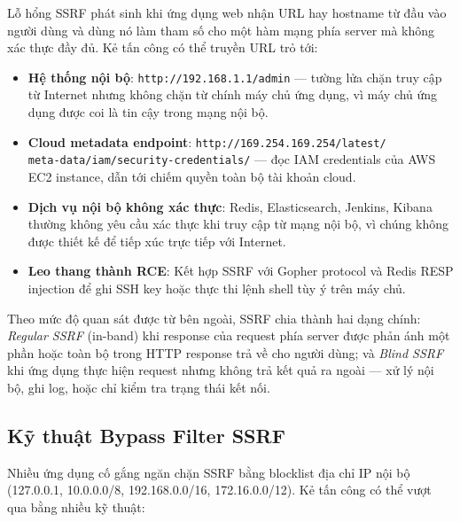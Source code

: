 Lỗ hổng SSRF phát sinh khi ứng dụng web nhận URL hay hostname từ đầu vào người dùng
và dùng nó làm tham số cho một hàm mạng phía server mà không xác thực đầy đủ. Kẻ
tấn công có thể truyền URL trỏ tới:

\begin{itemize}
    \item \textbf{Hệ thống nội bộ}: \texttt{http://192.168.1.1/admin} --- tường lửa
    chặn truy cập từ Internet nhưng không chặn từ chính máy chủ ứng dụng, vì máy chủ
    ứng dụng được coi là tin cậy trong mạng nội bộ.
    \item \textbf{Cloud metadata endpoint}: \texttt{http://169.254.169.254/latest/\\meta-data/iam/security-credentials/}
    --- đọc IAM credentials của AWS EC2 instance, dẫn tới chiếm quyền toàn bộ tài
    khoản cloud.
    \item \textbf{Dịch vụ nội bộ không xác thực}: Redis, Elasticsearch, Jenkins,
    Kibana thường không yêu cầu xác thực khi truy cập từ mạng nội bộ, vì chúng không
    được thiết kế để tiếp xúc trực tiếp với Internet.
    \item \textbf{Leo thang thành RCE}: Kết hợp SSRF với Gopher protocol và Redis RESP
    injection để ghi SSH key hoặc thực thi lệnh shell tùy ý trên máy chủ.
\end{itemize}

Theo mức độ quan sát được từ bên ngoài, SSRF chia thành hai dạng chính:
\textit{Regular SSRF} (in-band) khi response của request phía server được phản ánh
một phần hoặc toàn bộ trong HTTP response trả về cho người dùng; và \textit{Blind
SSRF} khi ứng dụng thực hiện request nhưng không trả kết quả ra ngoài --- xử lý nội
bộ, ghi log, hoặc chỉ kiểm tra trạng thái kết nối.

\subsection{Kỹ thuật Bypass Filter SSRF}

Nhiều ứng dụng cố gắng ngăn chặn SSRF bằng blocklist địa chỉ IP nội bộ
(127.0.0.1, 10.0.0.0/8, 192.168.0.0/16, 172.16.0.0/12). Kẻ tấn công có thể vượt
qua bằng nhiều kỹ thuật:

